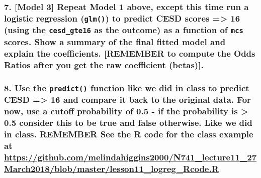 \documentclass[10pt,letterpaper]{article}
\begin{document}
\subsubsection{\texorpdfstring{7. {[}Model 3{]} Repeat Model 1 above,
except this time run a logistic regression (\texttt{glm()}) to predict
CESD scores =\textgreater{} 16 (using the \texttt{cesd\_gte16} as the
outcome) as a function of \texttt{mcs} scores. Show a summary of the
final fitted model and explain the coefficients. {[}\textbf{REMEMBER} to
compute the Odds Ratios after you get the raw coefficient
(betas){]}.}{7. {[}Model 3{]} Repeat Model 1 above, except this time run a logistic regression (glm()) to predict CESD scores =\textgreater{} 16 (using the cesd\_gte16 as the outcome) as a function of mcs scores. Show a summary of the final fitted model and explain the coefficients. {[}REMEMBER to compute the Odds Ratios after you get the raw coefficient (betas){]}.}}\label{model-3-repeat-model-1-above-except-this-time-run-a-logistic-regression-glm-to-predict-cesd-scores-16-using-the-cesd_gte16-as-the-outcome-as-a-function-of-mcs-scores.-show-a-summary-of-the-final-fitted-model-and-explain-the-coefficients.-remember-to-compute-the-odds-ratios-after-you-get-the-raw-coefficient-betas.}

\subsubsection{\texorpdfstring{8. Use the \texttt{predict()} function
like we did in class to predict CESD =\textgreater{} 16 and compare it
back to the original data. For now, use a cutoff probability of 0.5 - if
the probability is \textgreater{} 0.5 consider this to be true and false
otherwise. Like we did in class. \textbf{REMEMBER} See the R code for
the class example at
\url{https://github.com/melindahiggins2000/N741_lecture11_27March2018/blob/master/lesson11_logreg_Rcode.R}}{8. Use the predict() function like we did in class to predict CESD =\textgreater{} 16 and compare it back to the original data. For now, use a cutoff probability of 0.5 - if the probability is \textgreater{} 0.5 consider this to be true and false otherwise. Like we did in class. REMEMBER See the R code for the class example at https://github.com/melindahiggins2000/N741\_lecture11\_27March2018/blob/master/lesson11\_logreg\_Rcode.R}}\label{use-the-predict-function-like-we-did-in-class-to-predict-cesd-16-and-compare-it-back-to-the-original-data.-for-now-use-a-cutoff-probability-of-0.5---if-the-probability-is-0.5-consider-this-to-be-true-and-false-otherwise.-like-we-did-in-class.-remember-see-the-r-code-for-the-class-example-at-httpsgithub.commelindahiggins2000n741_lecture11_27march2018blobmasterlesson11_logreg_rcode.r}
\end{document}
